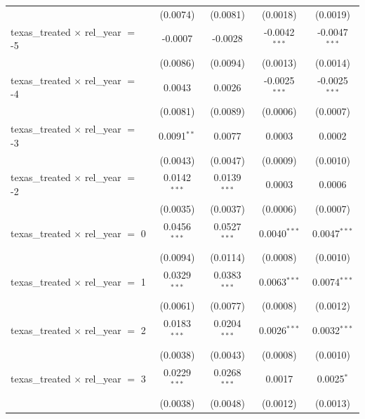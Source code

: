 \begin{tabular}{lcccc}
                                                & (0.0074)       & (0.0081)       & (0.0018)        & (0.0019)\\   
   texas\_treated $\times$ rel\_year $=$ -5     & -0.0007        & -0.0028        & -0.0042$^{***}$ & -0.0047$^{***}$\\   
                                                & (0.0086)       & (0.0094)       & (0.0013)        & (0.0014)\\   
   texas\_treated $\times$ rel\_year $=$ -4     & 0.0043         & 0.0026         & -0.0025$^{***}$ & -0.0025$^{***}$\\   
                                                & (0.0081)       & (0.0089)       & (0.0006)        & (0.0007)\\   
   texas\_treated $\times$ rel\_year $=$ -3     & 0.0091$^{**}$  & 0.0077         & 0.0003          & 0.0002\\   
                                                & (0.0043)       & (0.0047)       & (0.0009)        & (0.0010)\\   
   texas\_treated $\times$ rel\_year $=$ -2     & 0.0142$^{***}$ & 0.0139$^{***}$ & 0.0003          & 0.0006\\   
                                                & (0.0035)       & (0.0037)       & (0.0006)        & (0.0007)\\   
   texas\_treated $\times$ rel\_year $=$ 0      & 0.0456$^{***}$ & 0.0527$^{***}$ & 0.0040$^{***}$  & 0.0047$^{***}$\\   
                                                & (0.0094)       & (0.0114)       & (0.0008)        & (0.0010)\\   
   texas\_treated $\times$ rel\_year $=$ 1      & 0.0329$^{***}$ & 0.0383$^{***}$ & 0.0063$^{***}$  & 0.0074$^{***}$\\   
                                                & (0.0061)       & (0.0077)       & (0.0008)        & (0.0012)\\   
   texas\_treated $\times$ rel\_year $=$ 2      & 0.0183$^{***}$ & 0.0204$^{***}$ & 0.0026$^{***}$  & 0.0032$^{***}$\\   
                                                & (0.0038)       & (0.0043)       & (0.0008)        & (0.0010)\\   
   texas\_treated $\times$ rel\_year $=$ 3      & 0.0229$^{***}$ & 0.0268$^{***}$ & 0.0017          & 0.0025$^{*}$\\   
                                                & (0.0038)       & (0.0048)       & (0.0012)        & (0.0013)\\   

\end{tabular}
